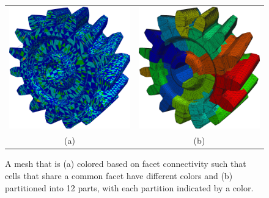 \begin{figure}
  \centering
  \begin{tabular}{cc}
    \includegraphics[width=\twofigs]{chapters/logg-2/png/coloured.png}
    &
    \includegraphics[width=\twofigs]{chapters/logg-2/png/partition.png}
    \\[1ex] (a) & (b)
  \end{tabular}
  \caption{A mesh that is (a) colored based on facet connectivity such
    that cells that share a common facet have different colors and
    (b) partitioned into 12 parts, with each partition indicated by
    a color.}
  \label{fig:logg-2:parallel}
\end{figure}

